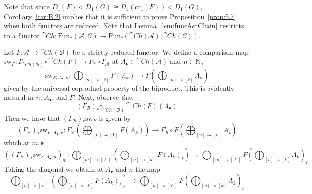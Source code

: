 Note that since $D_1(F)\lhd D_1(G)\cong D_1(\text{cr}_1(F))\lhd D_1(G)$, Corollary~\ref{cor:B.2} implies that it is sufficient to prove Proposition~\ref{prop:5.7} when both functors are reduced. Note that Lemma~\ref{lem:funcActChain} restricts to a functor $\cat{Ch}:\text{Fun}_*(\mathcal{A},\mathcal{C})\to \text{Fun}_*(\cat{Ch}(\mathcal{A}),\cat{Ch}(\mathcal{C}))$. 


\begin{rmk}
    Let $F:\mathcal{A}\to \cat{Ch}(\mathcal{B})$ be a strictly reduced functor. We define a comparison map $\text{sw}_F:\Gamma_{\cat{Ch}(\mathcal{B})}\circ \cat{Ch}(F)\to F_*\circ \Gamma_\mathcal{A}$ at $A_\bullet \in \cat{Ch}(\mathcal{A})$ and $n \in \mathbb N$,
    \begin{equation*}
        \text{sw}_{F,A_\bullet,n}:\bigoplus_{[n]\twoheadrightarrow [k]}F(A_k)\to F\left(\bigoplus_{[n]\twoheadrightarrow [k]}A_k\right)
    \end{equation*}
    given by the universal coproduct property of the biproduct. This is evidently natural in $n$, $A_\bullet$, and $F$. Next, observe that
    \begin{equation*}
        (\Gamma_\mathcal{B})_*\gamma_{\cat{Ch}(\mathcal{B})}\cat{Ch}(F)(A_\bullet)
    \end{equation*}
    Then we have that $(\Gamma_{\mathcal{B}})_*\text{sw}_F$ is given by 
    \begin{equation*}
        (\Gamma_{\mathcal{B}})_*\text{sw}_{F,A_\bullet,n}:\Gamma_\mathcal{B}\left(\bigoplus_{[n]\twoheadrightarrow [k]}F(A_k)\right)\to \Gamma_\mathcal{B}\circ F\left(\bigoplus_{[n]\twoheadrightarrow [k]}A_k\right)
    \end{equation*} 
    which at $m$ is
    \begin{equation*}
        ((\Gamma_{\mathcal{B}})_*\text{sw}_{F,A_\bullet,n})_m:\bigoplus_{[m]\twoheadrightarrow[\ell]}\left(\bigoplus_{[n]\twoheadrightarrow [k]}F(A_k)_\ell\right)\to \bigoplus_{[m]\twoheadrightarrow[\ell]}F\left(\bigoplus_{[n]\twoheadrightarrow [k]}A_k\right)_\ell
    \end{equation*}
    Taking the diagonal we obtain at $A_\bullet$ and $n$ the map
    \begin{equation*}
        \bigoplus_{[n]\twoheadrightarrow[\ell]}\left(\bigoplus_{[n]\twoheadrightarrow[k]}F(A_k)_\ell\right) \to \bigoplus_{[n]\twoheadrightarrow[\ell]}F\left(\bigoplus_{[n]\twoheadrightarrow[k]}A_k\right)_\ell
    \end{equation*}
\end{rmk}

